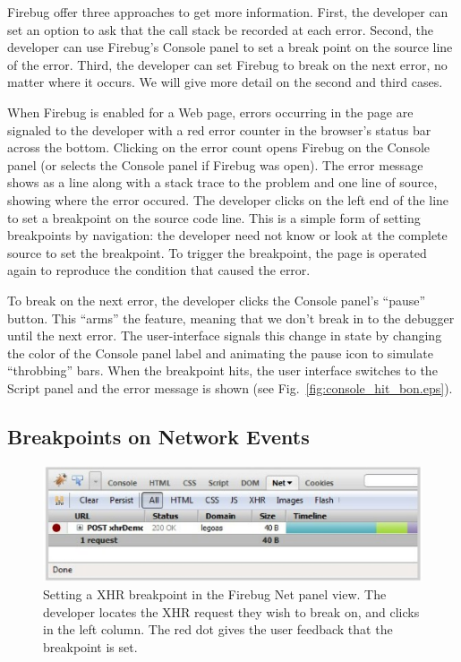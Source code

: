 \documentclass{www2010-accepted}
\begin{document}
Firebug offer three approaches to get more information. First, the
developer can set an option to ask that the call stack be recorded at
each error. Second,
the developer can use Firebug's Console panel to set a break point on
the source line of the error. Third, the developer can set Firebug to
break on the next error, no matter where it occurs.
We will give more detail on the second and third
cases.

When Firebug is enabled for a Web page, errors occurring in the page are
signaled to the developer with a red error counter in the browser's
status bar across the bottom. Clicking on the error count opens
Firebug on the Console panel (or selects the Console panel if Firebug
was open). The error message shows as a line along with a stack trace
to the problem and one line of source, showing where the error
occured. The developer clicks on the left end of the line to set a
breakpoint on the source code line. This is a simple form of setting
breakpoints by navigation: the developer need not know or look at the
complete source to set the breakpoint.  To trigger the breakpoint, the
page is operated again to reproduce the condition that caused the
error.

To break on the next error, the developer clicks the Console panel's ``pause''
button. This ``arms'' the feature, meaning that we don't break in to
the debugger until the next error. The
user-interface signals this change in state by changing the color
of the Console panel label
and animating the pause icon to simulate
``throbbing'' bars. When the breakpoint hits, the user interface
switches to the Script panel and the error message is shown (see
Fig.~\ref{fig:console_hit_bon.eps}).

\subsection{Breakpoints on Network Events}
\begin{figure}[htp]
\center
\includegraphics[scale=0.7]{net_create_breakpoint.eps}
\caption{Setting a XHR breakpoint in the Firebug Net panel view. The
developer locates the XHR request they wish to break on, and clicks in
the left column. The red dot gives the user feedback that the
breakpoint is set.}
\label{fig:net_create_breakpoint.eps}
\end{figure}
\end{document}
